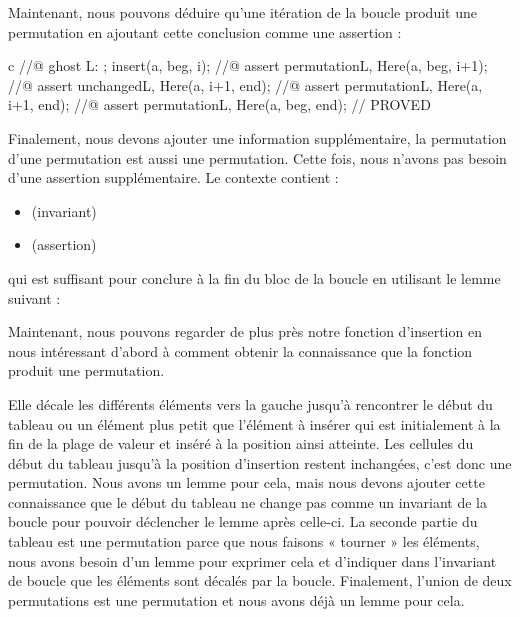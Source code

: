

Maintenant, nous pouvons déduire qu'une itération de la boucle produit
une permutation en ajoutant cette conclusion comme une assertion :


\begin{CodeBlock}{c}
    //@ ghost L: ;
    insert(a, beg, i);
    //@ assert permutation{L, Here}(a, beg, i+1);
    //@ assert unchanged{L, Here}(a, i+1, end);
    //@ assert permutation{L, Here}(a, i+1, end);
    //@ assert permutation{L, Here}(a, beg, end); // PROVED
\end{CodeBlock}


Finalement, nous devons ajouter une information supplémentaire, la permutation
d'une permutation est aussi une permutation. Cette fois, nous n'avons pas
besoin d'une assertion supplémentaire. Le contexte contient :
\begin{itemize}
\item {} (invariant)
\item {} (assertion)
\end{itemize}
qui est suffisant pour conclure 
à la fin du bloc de la boucle en utilisant le lemme suivant :




Maintenant, nous pouvons regarder de plus près notre fonction d'insertion en
nous intéressant d'abord à comment obtenir la connaissance que la fonction
produit une permutation.


Elle décale les différents éléments vers la gauche jusqu'à rencontrer le
début du tableau ou un élément plus petit que l'élément à insérer qui est
initialement à la fin de la plage de valeur et inséré à la position ainsi atteinte.
Les cellules du début du tableau jusqu'à la position d'insertion restent
inchangées, c'est donc une permutation. Nous avons un lemme pour cela, mais nous
devons ajouter cette connaissance que le début du tableau ne change pas comme
un invariant de la boucle pour pouvoir déclencher le lemme après celle-ci. La
seconde partie du tableau est une permutation parce que nous faisons « tourner »
les éléments, nous avons besoin d'un lemme pour exprimer cela et d'indiquer dans
l'invariant de boucle que les éléments sont décalés par la boucle. Finalement,
l'union de deux permutations est une permutation et nous avons déjà un lemme
pour cela.


